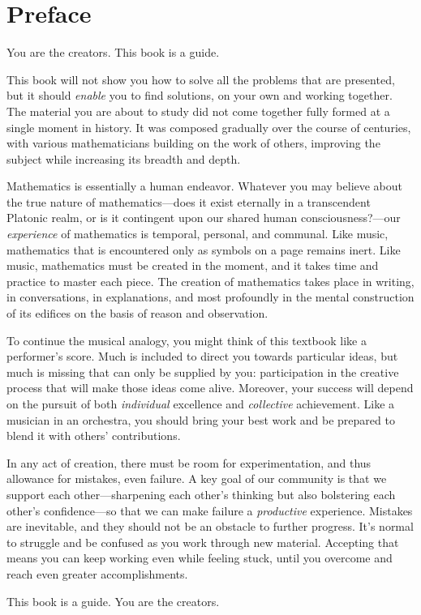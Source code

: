 \chapter*{Preface}

You are the creators. This book is a guide.

This book will not show you how to solve all the problems that are presented, but it should \emph{enable} you to find solutions, on your own and working together. The material you are about to study did not come together fully formed at a single moment in history. It was composed gradually over the course of centuries, with various mathematicians building on the work of others, improving the subject while increasing its breadth and depth.

Mathematics is essentially a human endeavor. Whatever you may believe about the true nature of mathematics---does it exist eternally in a transcendent Platonic realm, or is it contingent upon our shared human consciousness?---our \emph{experience} of mathematics is temporal, personal, and communal. Like music, mathematics that is encountered only as symbols on a page remains inert. Like music, mathematics must be created in the moment, and it takes time and practice to master each piece. The creation of mathematics takes place in writing, in conversations, in explanations, and most profoundly in the mental construction of its edifices on the basis of reason and observation.

To continue the musical analogy, you might think of this textbook like a performer's score. Much is included to direct you towards particular ideas, but much is missing that can only be supplied by you: participation in the creative process that will make those ideas come alive. Moreover, your success will depend on the pursuit of both \emph{individual} excellence and \emph{collective} achievement. Like a musician in an orchestra, you should bring your best work and be prepared to blend it with others' contributions.

In any act of creation, there must be room for experimentation, and thus allowance for mistakes, even failure. A key goal of our community is that we support each other---sharpening each other's thinking but also bolstering each other's confidence---so that we can make failure a \emph{productive} experience. Mistakes are inevitable, and they should not be an obstacle to further progress. It's normal to struggle and be confused as you work through new material. Accepting that means you can keep working even while feeling stuck, until you overcome and reach even greater accomplishments.

This book is a guide. You are the creators.